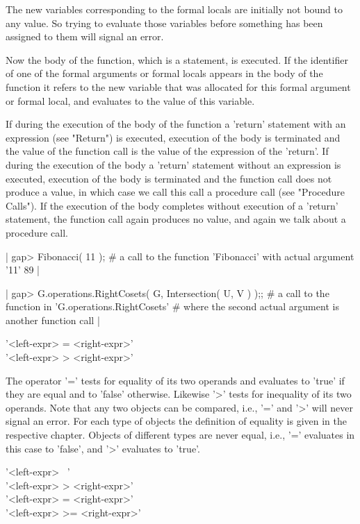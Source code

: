 The  new variables corresponding to the  formal  locals are initially not
bound to any   value.   So trying   to evaluate  those   variables before
something has been assigned to them will signal an error.

Now the body of the function, which is  a statement, is executed.  If the
identifier of one of the formal arguments or formal locals appears in the
body of the function it refers to the new variable that was allocated for
this formal argument or formal local, and evaluates to  the value of this
variable.

If during the execution of the body of the function  a 'return' statement
with  an expression (see "Return") is executed,  execution of the body is
terminated  and  the value  of  the function  call  is the value  of  the
expression  of  the 'return'.  If  during the  execution of  the  body  a
'return'  statement  without an expression is executed,  execution of the
body  is  terminated and the function  call does not produce  a value, in
which case  we call this call a procedure  call (see  "Procedure Calls").
If the  execution of  the body completes without execution of  a 'return'
statement, the  function call again produces no  value, and again we talk
about a procedure call.

|    gap> Fibonacci( 11 );
        # a call to the function 'Fibonacci' with actual argument '11'
    89 |
        
|    gap> G.operations.RightCosets( G, Intersection( U, V ) );;
        # a call to the function in 'G.operations.RightCosets'
        # where the second actual argument is another function call |


'<left-expr> =   <right-expr>' \\
'<left-expr> \<> <right-expr>'

The operator '=' tests for equality of  its two operands and evaluates to
'true' if they are equal and to 'false'  otherwise.  Likewise '\<>' tests
for  inequality of its  two operands.  Note  that any two  objects can be
compared, i.e., '=' and '\<>' will never  signal an error.  For each type
of objects the definition of equality is given in the respective chapter.
Objects of different types are  never equal, i.e.,  '=' evaluates in this
case to 'false', and '\<>' evaluates to 'true'.

'<left-expr> \<\ <right-expr>' \\
'<left-expr> >   <right-expr>' \\
'<left-expr> \<= <right-expr>' \\
'<left-expr> >=  <right-expr>'

